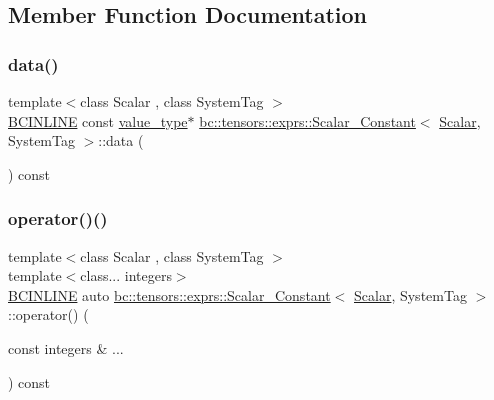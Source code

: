 \subsection{Member Function Documentation}
\mbox{\label{structbc_1_1tensors_1_1exprs_1_1Scalar__Constant_ad5eeeee8d6eb30adc571f775bbb13ae1}} 
\subsubsection{\texorpdfstring{data()}{data()}}
{\footnotesize\ttfamily template$<$class Scalar , class System\+Tag $>$ \\
\hyperlink{common_8h_a6699e8b0449da5c0fafb878e59c1d4b1}{B\+C\+I\+N\+L\+I\+NE} const \hyperlink{structbc_1_1Shape_3_010_01_4_a342cb50fc2de91d730a07750321bf986}{value\+\_\+type}$\ast$ \hyperlink{structbc_1_1tensors_1_1exprs_1_1Scalar__Constant}{bc\+::tensors\+::exprs\+::\+Scalar\+\_\+\+Constant}$<$ \hyperlink{namespacebc_aa12ac55ee2c43dc082894dd3859daee1}{Scalar}, System\+Tag $>$\+::data (\begin{DoxyParamCaption}{ }\end{DoxyParamCaption}) const\hspace{0.3cm}{\ttfamily [inline]}}

\mbox{\label{structbc_1_1tensors_1_1exprs_1_1Scalar__Constant_afc4637c795eced8eee778fdf86755212}} 
\subsubsection{\texorpdfstring{operator()()}{operator()()}}
{\footnotesize\ttfamily template$<$class Scalar , class System\+Tag $>$ \\
template$<$class... integers$>$ \\
\hyperlink{common_8h_a6699e8b0449da5c0fafb878e59c1d4b1}{B\+C\+I\+N\+L\+I\+NE} auto \hyperlink{structbc_1_1tensors_1_1exprs_1_1Scalar__Constant}{bc\+::tensors\+::exprs\+::\+Scalar\+\_\+\+Constant}$<$ \hyperlink{namespacebc_aa12ac55ee2c43dc082894dd3859daee1}{Scalar}, System\+Tag $>$\+::operator() (\begin{DoxyParamCaption}\item[{const integers \&}]{... }\end{DoxyParamCaption}) const\hspace{0.3cm}{\ttfamily [inline]}}

